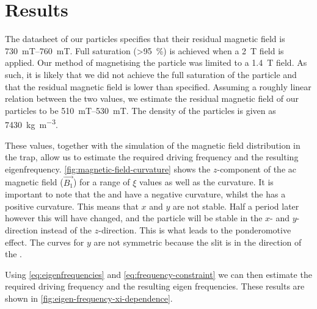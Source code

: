 \chapter{Results}
\label{chap:results}
The datasheet of our  particles specifies that their residual magnetic field is \qtyrange{730}{760}{\milli\tesla}. Full saturation (\qty{>95}{\percent}) is achieved when a \qty{2}{\tesla} field is applied\cite{magnequench}. Our method of magnetising the particle was limited to a \qty{1.4}{\tesla} field. As such, it is likely that we did not achieve the full saturation of the particle and that the residual magnetic field is lower than specified. Assuming a roughly linear relation between the two values, we estimate the residual magnetic field of our particles to be \qtyrange{510}{530}{\milli\tesla}. The density of the particles is given as \qty{7430}{\kilo\gram\per\cubic\meter}\cite{magnequench}.

These values, together with the simulation of the magnetic field distribution in the trap, allow us to estimate the required driving frequency and the resulting eigenfrequency. \autoref{fig:magnetic-field-curvature} shows the $z$-component of the ac magnetic field ($\vec{B_1}$) for a range of $\xi$ values as well as the curvature. It is important to note that the \xmode and \ymode have a negative curvature, whilst the \zmode has a positive curvature. This means that $x$ and $y$ are not stable. Half a period later however this will have changed, and the particle will be stable in the $x$- and $y$-direction instead of the $z$-direction. This is what leads to the ponderomotive effect. The curves for $y$ are not symmetric because the slit is in the direction of the \ymode.

Using \autoref{eq:eigenfrequencies} and \autoref{eq:frequency-constraint} we can then estimate the required driving frequency and the resulting eigen frequencies. These results are shown in \autoref{fig:eigen-frequency-xi-dependence}.

